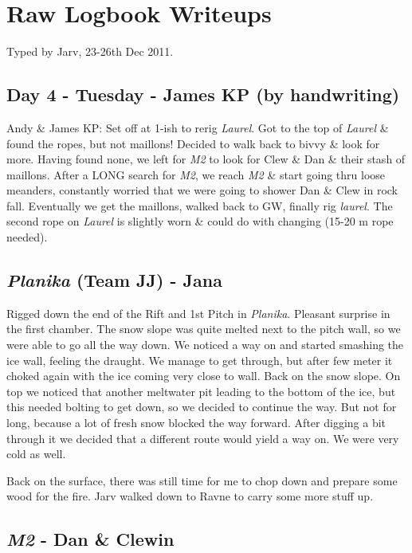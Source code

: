 \section{Raw Logbook Writeups}

Typed by Jarv, 23-26th Dec 2011.

\subsection{Day 4 - Tuesday - James KP (by
handwriting)}

Andy \& James KP: Set off at 1-ish to rerig \emph{Laurel}. Got to the
top of \emph{Laurel} \& found the ropes, but not maillons! Decided to
walk back to bivvy \& look for more. Having found none, we left for
\emph{M2} to look for Clew \& Dan \& their stash of maillons. After a
LONG search for \emph{M2}, we reach \emph{M2} \& start going thru loose
meanders, constantly worried that we were going to shower Dan \& Clew in
rock fall. Eventually we get the maillons, walked back to GW, finally
rig \emph{laurel}. The second rope on \emph{Laurel} is slightly worn \&
could do with changing (15-20 m rope needed).

\subsection{\texorpdfstring{\emph{Planika} (Team JJ) -
Jana}{Planika (Team JJ) - Jana}}

Rigged down the end of the Rift and 1st Pitch in \emph{Planika}.
Pleasant surprise in the first chamber. The snow slope was quite melted
next to the pitch wall, so we were able to go all the way down. We
noticed a way on and started smashing the ice wall, feeling the draught.
We manage to get through, but after few meter it choked again with the
ice coming very close to wall. Back on the snow slope. On top we noticed
that another meltwater pit leading to the bottom of the ice, but this
needed bolting to get down, so we decided to continue the way. But not
for long, because a lot of fresh snow blocked the way forward. After
digging a bit through it we decided that a different route would yield a
way on. We were very cold as well.

Back on the surface, there was still time for me to chop down and
prepare some wood for the fire. Jarv walked down to Ravne to carry some
more stuff up.


\subsection{\texorpdfstring{\emph{M2} - Dan \&
Clewin}{M2 - Dan \& Clewin}}

